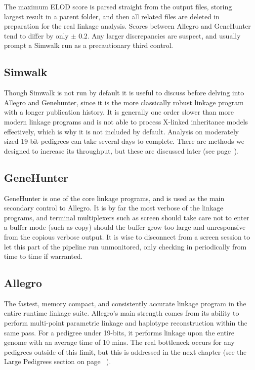 The maximum ELOD score is parsed straight from the output files, storing largest result in a parent folder, and then all related files are deleted in preparation for the real linkage analysis. Scores between Allegro and GeneHunter tend to differ by only $\pm$ 0.2. Any larger discrepancies are suspect, and usually prompt a Simwalk run as a precautionary third control.

\subsection{Simwalk}

Though Simwalk is not run by default it is useful to discuss before delving into Allegro and Genehunter, since it is the more classically robust linkage program with a longer publication history\citep{simwalk}. It is generally one order slower than more modern linkage programs and is not able to process X-linked inheritance models effectively, which is why it is not included by default.  Analysis on moderately sized 19-bit pedigrees can take several days to complete. There are methods we designed to increase its throughput, but these are discussed later (see page~\pageref{ref:meth:simwalkmulti}).


\subsection{GeneHunter}

GeneHunter is one of the core linkage programs, and is used as the main secondary control to Allegro. It is by far the most verbose of the linkage programs, and terminal multiplexers such as screen should take care not to enter a buffer mode (such as copy) should the buffer grow too large and unresponsive from the copious verbose output. It is wise to disconnect from a screen session to let this part of the pipeline run unmonitored, only checking in periodically from time to time if warranted.

\subsection{Allegro}

The fastest, memory compact, and consistently accurate linkage program in the entire runtime linkage suite. Allegro's main strength comes from its ability to perform multi-point parametric linkage and haplotype reconstruction within the same pass. For a pedigree under 19-bits, it performs linkage upon the entire genome with an average time of 10 mins. The real bottleneck occurs for any pedigrees outside of this limit, but this is addressed in the next chapter (see the Large Pedigrees section on page~\pageref{ref:meth:largepeds} ).


